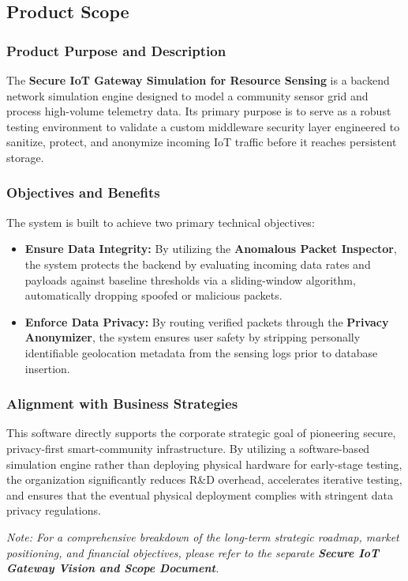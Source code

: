 \documentclass[12pt,letterpaper]{article}
\begin{document}
\subsection{Product Scope}
\subsubsection{Product Purpose and Description}
The \textbf{Secure IoT Gateway Simulation for Resource Sensing} is a backend network simulation engine designed to model a community sensor grid and process high-volume telemetry data. Its primary purpose is to serve as a robust testing environment to validate a custom middleware security layer engineered to sanitize, protect, and anonymize incoming IoT traffic before it reaches persistent storage.\par
\subsubsection{Objectives and Benefits}
The system is built to achieve two primary technical objectives:\par
\begin{itemize}
\item \textbf{Ensure Data Integrity:} By utilizing the \textbf{Anomalous Packet Inspector}, the system protects the backend by evaluating incoming data rates and payloads against baseline thresholds via a sliding-window algorithm, automatically dropping spoofed or malicious packets.
\item \textbf{Enforce Data Privacy:} By routing verified packets through the \textbf{Privacy Anonymizer}, the system ensures user safety by stripping personally identifiable geolocation metadata from the sensing logs prior to database insertion.
\end{itemize}
\subsubsection{Alignment with Business Strategies}
This software directly supports the corporate strategic goal of pioneering secure, privacy-first smart-community infrastructure. By utilizing a software-based simulation engine rather than deploying physical hardware for early-stage testing, the organization significantly reduces R\&D overhead, accelerates iterative testing, and ensures that the eventual physical deployment complies with stringent data privacy regulations.\par
\emph{Note: For a comprehensive breakdown of the long-term strategic roadmap, market positioning, and financial objectives, please refer to the separate }\textbf{\emph{Secure IoT Gateway Vision and Scope Document}}\emph{.}\par
\vspace{0.08in}
\end{document}

